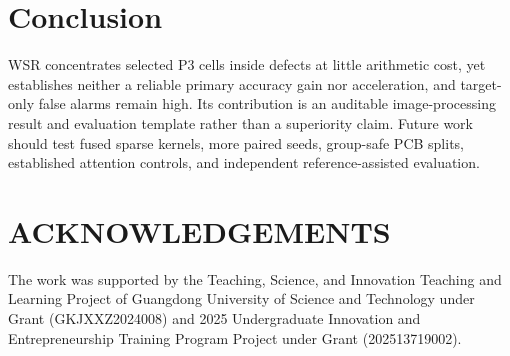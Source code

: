 \documentclass[conference]{IEEEtran}
\begin{document}
\section{Conclusion}
WSR concentrates selected P3 cells inside defects at little arithmetic cost, yet establishes neither a reliable primary accuracy gain nor acceleration, and target-only false alarms remain high. Its contribution is an auditable image-processing result and evaluation template rather than a superiority claim. Future work should test fused sparse kernels, more paired seeds, group-safe PCB splits, established attention controls, and independent reference-assisted evaluation.

\section*{ACKNOWLEDGEMENTS}
The work was supported by the Teaching, Science, and Innovation Teaching and Learning Project of Guangdong University of Science and Technology under Grant (GKJXXZ2024008) and 2025 Undergraduate Innovation and Entrepreneurship Training Program Project under Grant (202513719002).
\end{document}
